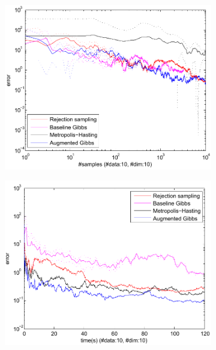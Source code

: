 \begin{figure}
\centering
\begin{subfigure}{.40\textwidth}
  \centering
  \includegraphics[width=1.00\textwidth]{pic/errVsamplesBPPL10.pdf}
  \caption{}
  \label{fig:error-samples-bppl}
\end{subfigure}
\begin{subfigure}{.40\textwidth}
  \centering
  \includegraphics[width=1.00\textwidth]{pic/errVtimeBPPL10.pdf}
  \caption{}
  \label{fig:error-samples-bppl}
\end{subfigure}
\\%

\end{figure}
